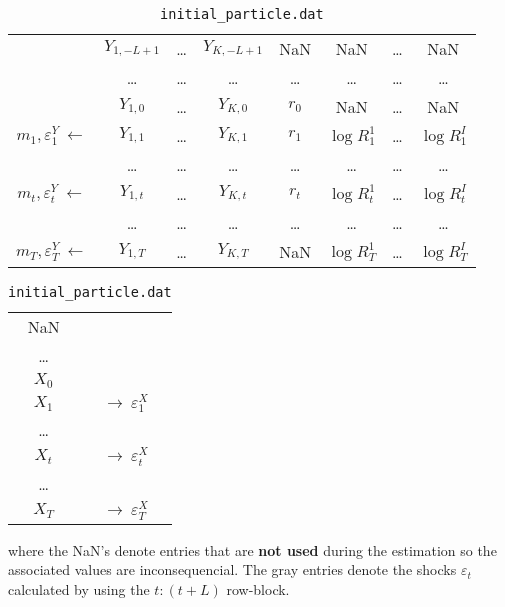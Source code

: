 \documentclass[11pt, letterpaper, notitlepage]{article}
\begin{document}
\begin{table}[!htb]
\begin{minipage}{.7\linewidth}
\centering
\begin{tabular}{cccccccc}
& $Y_{1, -L+1}$ & \dots & $Y_{K, -L+1}$ & NaN & NaN & \dots & NaN \\
& \dots & \dots & \dots & \dots & \dots & \dots & \dots \\
& $Y_{1, 0}$ & \dots & $Y_{K, 0}$ & $r_0$ & NaN & \dots & NaN \\ \hline
\textcolor{mygray}{$m_1, \varepsilon^Y_1 \ \leftarrow$} & $Y_{1, 1}$ & \dots & $Y_{K, 1}$ & $r_1$ & $\log R^{1}_1$ & \dots & $\log R^{I}_1$ \\ 
& \dots & \dots & \dots & \dots & \dots & \dots & \dots \\
\textcolor{mygray}{$m_t, \varepsilon^Y_t \ \leftarrow$} & $Y_{1, t}$ & \dots & $Y_{K, t}$ & $r_t$ & $\log R^{1}_t$ & \dots & $\log R^{I}_t$ \\ 
& \dots & \dots & \dots & \dots & \dots & \dots & \dots \\
\textcolor{mygray}{$m_T, \varepsilon^Y_T \ \leftarrow$} & $Y_{1, T}$ & \dots & $Y_{K, T}$ & NaN & $\log R^{1}_T$ & \dots & $\log R^{I}_T$ \\ 
\end{tabular}
\caption*{\texttt{data.dat}}
\end{minipage}%
\begin{minipage}{.3\linewidth}
\centering
\begin{tabular}{cc}
 NaN  & \\
\dots & \\
$X_0$ & \\\hline
$X_1$ & \textcolor{mygray}{$\rightarrow \ \varepsilon^X_1$} \\
\dots & \\
$X_t$ & \textcolor{mygray}{$\rightarrow \ \varepsilon^X_t$} \\
\dots & \\
$X_T$ & \textcolor{mygray}{$\rightarrow \ \varepsilon^X_T$} \\      
\end{tabular}                
\caption*{\texttt{initial\_particle.dat}}
\end{minipage} 
\end{table}
where the NaN's denote entries that are \textbf{not used} during the estimation so the associated values are inconsequencial. The gray entries denote the shocks $\varepsilon_t$ calculated by using the $t:(t+L)$ row-block.   
\end{document}
